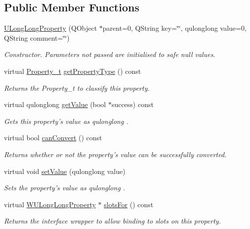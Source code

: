 \subsection*{Public Member Functions}
\begin{DoxyCompactItemize}
\item 
\hyperlink{class_u_long_long_property_a2e62bdd765cd03324aa8abd4c84fb97a}{U\-Long\-Long\-Property} (Q\-Object $\ast$parent=0, Q\-String key=\char`\"{}\char`\"{}, qulonglong value=0, Q\-String comment=\char`\"{}\char`\"{})
\begin{DoxyCompactList}\small\item\em Constructor. Parameters not passed are initialised to safe null values. \end{DoxyCompactList}\item 
virtual \hyperlink{group___property_classes_ga38f1ccddda12c7cb50b868c9f789ee37}{Property\-\_\-t} \hyperlink{class_u_long_long_property_aaad8c3be9d1037f10e7bcd0713a404a9}{get\-Property\-Type} () const 
\begin{DoxyCompactList}\small\item\em Returns the Property\-\_\-t to classify this property. \end{DoxyCompactList}\item 
virtual qulonglong \hyperlink{class_u_long_long_property_ac2dadcd92de6e92c58620ebfd1e50b66}{get\-Value} (bool $\ast$success) const 
\begin{DoxyCompactList}\small\item\em Gets this property's value as qulonglong . \end{DoxyCompactList}\item 
virtual bool \hyperlink{class_u_long_long_property_a9b670e3778650e496146c24ac133c136}{can\-Convert} () const 
\begin{DoxyCompactList}\small\item\em Returns whether or not the property's value can be successfully converted. \end{DoxyCompactList}\item 
virtual void \hyperlink{class_u_long_long_property_abb1dcbdd5327e7cd261df653dadcc2c9}{set\-Value} (qulonglong value)
\begin{DoxyCompactList}\small\item\em Sets the property's value as qulonglong . \end{DoxyCompactList}\item 
virtual \hyperlink{class_w_u_long_long_property}{W\-U\-Long\-Long\-Property} $\ast$ \hyperlink{class_u_long_long_property_a17ca304df37d8fa3b78e9e685e627999}{slots\-For} () const 
\begin{DoxyCompactList}\small\item\em Returns the interface wrapper to allow binding to slots on this property. \end{DoxyCompactList}\end{DoxyCompactItemize}
